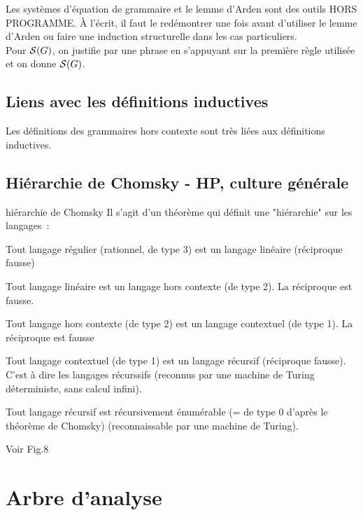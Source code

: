 \begin{adjustwidth}{-3cm}{-3cm}
\begin{remarque}{}{}
    Les systèmes d'équation de grammaire et le lemme d'Arden sont des outils HORS PROGRAMME. À l'écrit, il faut le redémontrer une fois avant d'utiliser le lemme d'Arden ou faire une induction structurelle dans les cas particuliers.\\
    Pour $\mathcal{S}(G)$, on justifie par une phrase en s'appuyant sur la première règle utilisée et on donne $\mathcal{S}(G)$.
\end{remarque}

\subsection{Liens avec les définitions inductives}

Les définitions des grammaires hors contexte sont très liées aux définitions inductives.

\subsection{Hiérarchie de Chomsky - HP, culture générale}

\begin{theoreme}{}{hiérarchie de Chomsky}
    Il s'agit d'un théorème qui définit une "hiérarchie" sur les langages~:
    \begin{enumeratebf}
        \item Tout langage régulier (rationnel, de type 3) est un langage linéaire (réciproque fausse)
        \item Tout langage linéaire est un langage hors contexte (de type 2). La réciproque est fausse.
        \item Tout langage hors contexte (de type 2) est un langage contextuel (de type 1). La réciproque est fausse
        \item Tout langage contextuel (de type 1) est un langage récursif (réciproque fausse). C'est à dire les langages récurssifs (\ie reconnus par une machine de Turing déterministe, sans calcul infini).
        \item Tout langage récursif est récursivement énumérable (= de type 0 d'après le théorème de Chomsky) (reconnaissable par une machine de Turing).
    \end{enumeratebf}
    Voir Fig.8
\end{theoreme}

\section{Arbre d'analyse}


\end{adjustwidth}
